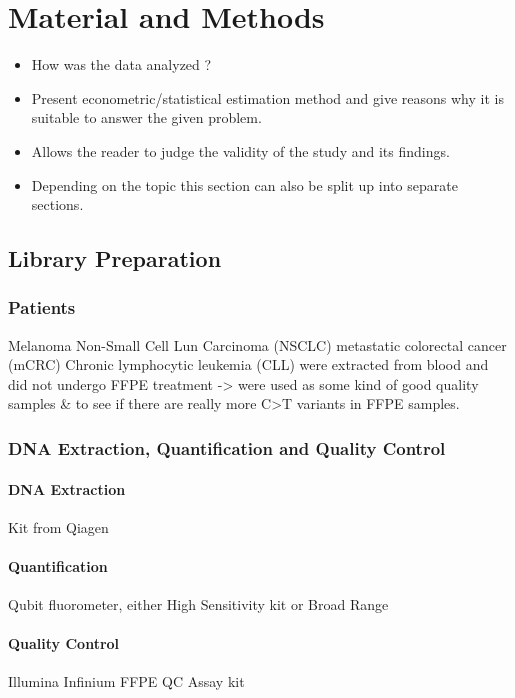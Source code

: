 \section{Material and Methods}\label{Sec:Method}

\begin{itemize}

\item How was the data analyzed ?

\item Present econometric/statistical estimation method and
give reasons why it is suitable to answer the given problem.

\item Allows the reader to judge the validity of the study and
its findings.

\item Depending on the topic this section can also be split up
into separate sections.

\end{itemize}

\subsection{Library Preparation}
\subsubsection{Patients}
Melanoma
Non-Small Cell Lun Carcinoma (NSCLC)
metastatic colorectal cancer (mCRC)
Chronic lymphocytic leukemia (CLL) were extracted from blood and did not undergo
FFPE treatment -> were used as some kind of good quality samples & to see if there
are really more C>T variants in FFPE samples.

\subsubsection{DNA Extraction, Quantification and Quality Control}
\paragraph{DNA Extraction}
Kit from Qiagen
\paragraph{Quantification}
Qubit fluorometer, either High Sensitivity kit or Broad Range
\paragraph{Quality Control}
Illumina Infinium FFPE QC Assay kit
